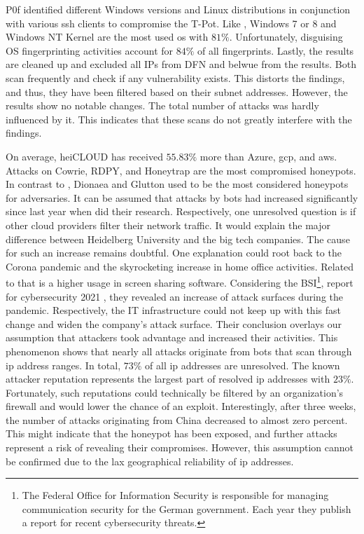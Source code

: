 P0f identified different Windows versions and Linux distributions in conjunction with various \ac{ssh} clients to compromise the T-Pot.
Like \citet{Kelly2021}, Windows 7 or 8 and Windows NT Kernel are the most used \ac{os} with $81\%$.
Unfortunately, disguising OS fingerprinting activities account for $84\%$ of all fingerprints.
Lastly, the results are cleaned up and excluded all IPs from DFN and \acs{belwue} from the results.
Both scan frequently and check if any vulnerability exists.
This distorts the findings, and thus, they have been filtered based on their subnet addresses.
However, the results show no notable changes.
The total number of attacks was hardly influenced by it.
This indicates that these scans do not greatly interfere with the findings.

On average, heiCLOUD has received $55.83\%$ more than Azure, \ac{gcp}, and \ac{aws}.
Attacks on Cowrie, RDPY, and Honeytrap are the most compromised honeypots.
In contrast to \citet{Kelly2021}, Dionaea and Glutton used to be the most considered honeypots for adversaries.
It can be assumed that attacks by bots had increased significantly since last year when \citet{Kelly2021} did their research.
Respectively, one unresolved question is if other cloud providers filter their network traffic.
It would explain the major difference between Heidelberg University and the big tech companies.
The cause for such an increase remains doubtful.
One explanation could root back to the Corona pandemic and the skyrocketing increase in home office activities.
Related to that is a higher usage in screen sharing software.
Considering the BSI\footnote{The Federal Office for Information Security is responsible for managing communication security for the German government.
Each year they publish a report for recent cybersecurity threats.}, report for cybersecurity 2021 \cite{bsi2021}, they revealed an increase of attack surfaces during the pandemic.
Respectively, the IT infrastructure could not keep up with this fast change and widen the company's attack surface.
Their conclusion overlays our assumption that attackers took advantage and increased their activities.
This phenomenon shows that nearly all attacks originate from bots that scan through \ac{ip} address ranges.
In total, $73\%$ of all \ac{ip} addresses are unresolved.
The known attacker reputation represents the largest part of resolved \ac{ip} addresses with $23\%$.
Fortunately, such reputations could technically be filtered by an organization's firewall and would lower the chance of an exploit.
Interestingly, after three weeks, the number of attacks originating from China decreased to almost zero percent.
This might indicate that the honeypot has been exposed, and further attacks represent a risk of revealing their compromises.
However, this assumption cannot be confirmed due to the lax geographical reliability of \ac{ip} addresses.

